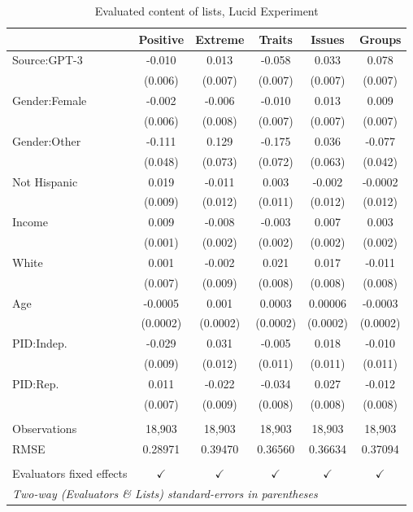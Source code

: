 \documentclass[11pt]{article}
\begin{document}
\begin{table}
\centering
%
\begin{tabular}{lccccc}
\toprule
&Positive&Extreme&Traits&Issues&Groups\\
\midrule Source:GPT-3&-0.010 & 0.013 & -0.058 & 0.033 & 0.078\\
  &(0.006) & (0.007) & (0.007) & (0.007) & (0.007)\\
Gender:Female&-0.002 & -0.006 & -0.010 & 0.013 & 0.009\\
  &(0.006) & (0.008) & (0.007) & (0.007) & (0.007)\\
Gender:Other&-0.111 & 0.129 & -0.175 & 0.036 & -0.077\\
  &(0.048) & (0.073) & (0.072) & (0.063) & (0.042)\\
Not Hispanic&0.019 & -0.011 & 0.003 & -0.002 & -0.0002\\
  &(0.009) & (0.012) & (0.011) & (0.012) & (0.012)\\
Income&0.009 & -0.008 & -0.003 & 0.007 & 0.003\\
  &(0.001) & (0.002) & (0.002) & (0.002) & (0.002)\\
White&0.001 & -0.002 & 0.021 & 0.017 & -0.011\\
  &(0.007) & (0.009) & (0.008) & (0.008) & (0.008)\\
Age&-0.0005 & 0.001 & 0.0003 & 0.00006 & -0.0003\\
  &(0.0002) & (0.0002) & (0.0002) & (0.0002) & (0.0002)\\
PID:Indep.&-0.029 & 0.031 & -0.005 & 0.018 & -0.010\\
  &(0.009) & (0.012) & (0.011) & (0.011) & (0.011)\\
PID:Rep.&0.011 & -0.022 & -0.034 & 0.027 & -0.012\\
  &(0.007) & (0.009) & (0.008) & (0.008) & (0.008)\\
 &  & & & & \\
Observations & 18,903&18,903&18,903&18,903&18,903\\
RMSE & 0.28971&0.39470&0.36560&0.36634&0.37094\\
 &   &   &   &   &  \\
Evaluators fixed effects & $\checkmark$ & $\checkmark$ & $\checkmark$ & $\checkmark$ & $\checkmark$\\
\bottomrule
\multicolumn{6}{l}{\emph{Two-way (Evaluators \& Lists) standard-errors in parentheses}}\\
\end{tabular}
%
\caption{Evaluated content of lists, Lucid Experiment}
\label{tab:codcontent}
\end{table}
\end{document}
